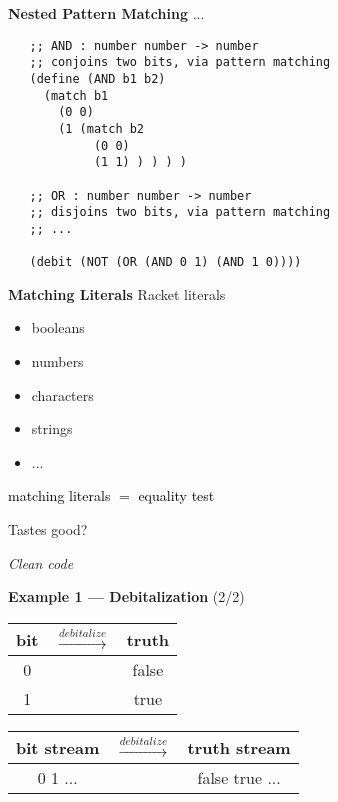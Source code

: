 \documentclass[12pt]{beamer}
\newcommand{\hl}[1]{\textcolor{black}{#1}}
\begin{document}
\begin{frame}[fragile]{\bf Nested Pattern Matching}
 ...

 {\footnotesize
  \begin{verbatim}
   ;; AND : number number -> number
   ;; conjoins two bits, via pattern matching
   (define (AND b1 b2)
     (match b1
       (0 0)
       (1 (match b2
            (0 0)
            (1 1) ) ) ) )

   ;; OR : number number -> number
   ;; disjoins two bits, via pattern matching
   ;; ...

   (debit (NOT (OR (AND 0 1) (AND 1 0))))
  \end{verbatim}
 }
\end{frame}

\begin{frame}{\bf Matching Literals}
 Racket literals
 \begin{itemize}
  \item booleans
  \item numbers
  \pause
  \item characters
  \pause
  \item strings
  \item ...
 \end{itemize}

 \pause

 \hl{matching literals $=$ equality test}
\end{frame}

\begin{frame}[plain]
 \begin{center}
  {\LARGE
   Tastes good?
 
   \pause

   \em
   Clean code
  }
 \end{center}
\end{frame}

\begin{frame}[fragile]{{\bf Example 1 --- Debitalization} (2/2)}
 \large
 \begin{table}
  \centering
  \begin{tabular}{ccc}
   bit & $\overset{debitalize}{\longrightarrow}$ & truth \\
   \hline
   0   &                                         & false \\
   1   &                                         & true  \\
  \end{tabular}
 \end{table}

 \pause

 \begin{table}
  \centering
  \begin{tabular}{ccc}
   bit stream & $\overset{debitalize}{\longrightarrow}$ & truth stream   \\
   \hline
   0 1 ...    &                                         & false true ...
  \end{tabular}
 \end{table}
\end{frame}
\end{document}
